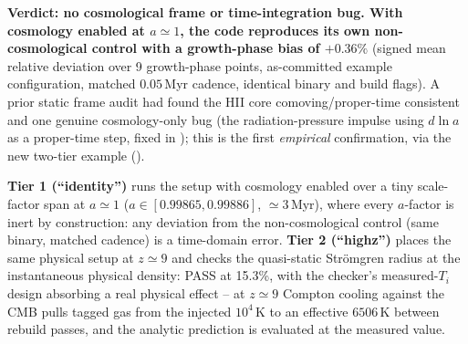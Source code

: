 \textbf{Verdict: no cosmological frame or time-integration bug. With
cosmology enabled at $a\simeq1$, the code reproduces its own
non-cosmological control with a growth-phase bias of $+0.36\%$} (signed
mean relative deviation over 9 growth-phase points, as-committed
example configuration, matched $0.05\,$Myr cadence, identical binary
and build flags). A prior static frame audit
had found the HII core comoving/proper-time consistent and one genuine
cosmology-only bug (the radiation-pressure impulse using $d\ln a$ as a
proper-time step, fixed in ); this is the first
\emph{empirical} confirmation, via the new two-tier
 example ().

\textbf{Tier 1 (``identity'')} runs the  setup
with cosmology enabled over a tiny scale-factor span at $a\simeq1$
($a\in[0.99865, 0.99886]$, $\simeq3\,$Myr), where every $a$-factor is
inert by construction: any deviation from the non-cosmological control
(same binary, matched cadence) is a time-domain error. \textbf{Tier 2
(``highz'')} places the same physical setup at $z\simeq9$ and checks
the quasi-static Str\"omgren radius at the instantaneous physical
density: PASS at 15.3\%, with the checker's measured-$T_i$ design
absorbing a real physical effect -- at $z\simeq9$ Compton cooling
against the CMB pulls tagged gas from the injected $10^4\,$K to an
effective $6506\,$K between rebuild passes, and the analytic prediction
is evaluated at the measured value.

